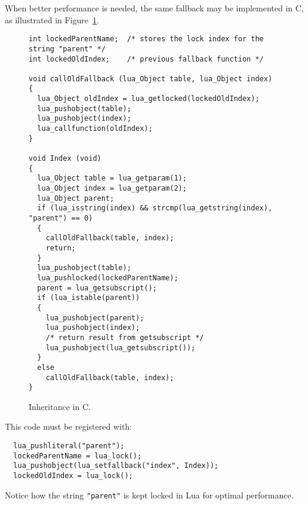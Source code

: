 When better performance is needed,
the same fallback may be implemented in C,
as illustrated in Figure~\ref{Cinher}.
\begin{figure}
\Line
\begin{verbatim}
int lockedParentName;  /* stores the lock index for the string "parent" */
int lockedOldIndex;    /* previous fallback function */

void callOldFallback (lua_Object table, lua_Object index)
{
  lua_Object oldIndex = lua_getlocked(lockedOldIndex);
  lua_pushobject(table);
  lua_pushobject(index);
  lua_callfunction(oldIndex);
}

void Index (void)
{
  lua_Object table = lua_getparam(1);
  lua_Object index = lua_getparam(2);
  lua_Object parent;
  if (lua_isstring(index) && strcmp(lua_getstring(index), "parent") == 0)
  {
    callOldFallback(table, index);
    return;
  }
  lua_pushobject(table);
  lua_pushlocked(lockedParentName);
  parent = lua_getsubscript();
  if (lua_istable(parent))
  {
    lua_pushobject(parent);
    lua_pushobject(index);
    /* return result from getsubscript */
    lua_pushobject(lua_getsubscript());
  }
  else
    callOldFallback(table, index);
}
\end{verbatim}
\caption{Inheritance in C.\label{Cinher}}
\Line
\end{figure}
This code must be registered with:
\begin{verbatim}
  lua_pushliteral("parent");
  lockedParentName = lua_lock();
  lua_pushobject(lua_setfallback("index", Index));
  lockedOldIndex = lua_lock();
\end{verbatim}
Notice how the string \verb'"parent"' is kept
locked in Lua for optimal performance.

